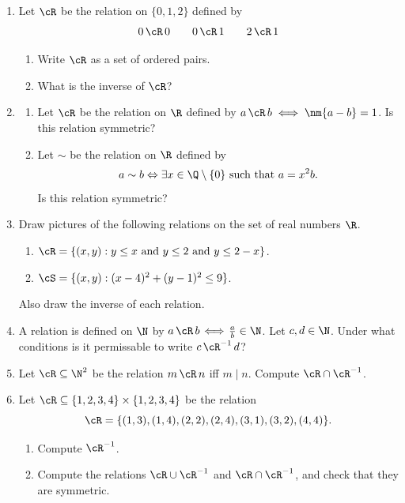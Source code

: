 \begin{enumerate}\renewcommand{\labelenumi}{\thesubsection.\theenumi}
  \item Let $\cR$ be the relation on $\{0,1,2\}$ defined by
  \[0\,\cR\,0\qquad 0\,\cR\,1\qquad 2\,\cR\,1\]
  \begin{enumerate}
    \item Write $\cR$ as a set of ordered pairs.
    \item What is the inverse of $\cR$?
	\end{enumerate}
	
	\item \begin{enumerate} \item Let $\cR$ be the relation on $\R$ defined by $a\,\cR\,b\iff\nm{a-b}=1$. Is this relation symmetric? 
 \item Let $\sim$ be the relation on $\R$ defined by 
\[
a \sim b \Leftrightarrow \exists x \in \Q \setminus \{0\} \text{ such that } a = x^2 b.
\]
Is this relation symmetric? 

 \end{enumerate}
  
	\item Draw pictures of the following relations on the set of real numbers $\R$.
		\begin{enumerate}
			\item $\cR=\{(x,y):y\le x\text{ and }y\le 2\text{ and }y\le 2-x\}$.
			\item $\cS=\{(x,y):(x-4)^2+(y-1)^2\le 9\}$.
		\end{enumerate}
	Also draw the inverse of each relation.
	
	\item A relation is defined on $\N$ by $a\,\cR\,b\!\iff\! \frac ab\in\N$. Let $c,d\in\N$. Under what conditions is it permissable to write $c\,\cR^{-1}\,d$?
	
	\item Let $\cR \subseteq \N^2$ be the relation $m \, \cR \, n$ iff $m \mid n$. Compute $\cR \cap \cR^{-1}$.
	
	\item Let $\cR\subseteq\{1,2,3,4\}\times\{1,2,3,4\}$ be the relation
	\[\cR=\{(1,3),(1,4),(2,2),(2,4),(3,1),(3,2),(4,4)\}.\]
	\begin{enumerate}
	  \item Compute $\cR^{-1}$.
	  \item Compute the relations $\cR\cup \cR^{-1}$ and $\cR\cap \cR^{-1}$, and check that they are symmetric.
	\end{enumerate}
  

\end{enumerate}
